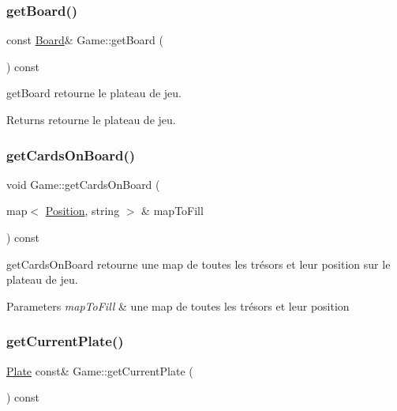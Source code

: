 \subsubsection{\texorpdfstring{getBoard()}{getBoard()}}
{\footnotesize\ttfamily const \mbox{\hyperlink{class_board}{Board}}\& Game\+::get\+Board (\begin{DoxyParamCaption}{ }\end{DoxyParamCaption}) const\hspace{0.3cm}{\ttfamily [inline]}}



get\+Board retourne le plateau de jeu. 

\begin{DoxyReturn}{Returns}
retourne le plateau de jeu. 
\end{DoxyReturn}
\mbox{\label{class_game_a1a21ba908bedd3ca0ae4ea0f63c621d4}} 
\subsubsection{\texorpdfstring{getCardsOnBoard()}{getCardsOnBoard()}}
{\footnotesize\ttfamily void Game\+::get\+Cards\+On\+Board (\begin{DoxyParamCaption}\item[{map$<$ \mbox{\hyperlink{class_position}{Position}}, string $>$ \&}]{map\+To\+Fill }\end{DoxyParamCaption}) const\hspace{0.3cm}{\ttfamily [inline]}}



get\+Cards\+On\+Board retourne une map de toutes les trésors et leur position sur le plateau de jeu. 


\begin{DoxyParams}{Parameters}
{\em map\+To\+Fill} & une map de toutes les trésors et leur position \\
\hline
\end{DoxyParams}
\mbox{\label{class_game_a09dad4385b60fb6af3c93de9d7dad0dd}} 
\subsubsection{\texorpdfstring{getCurrentPlate()}{getCurrentPlate()}}
{\footnotesize\ttfamily \mbox{\hyperlink{class_plate}{Plate}} const\& Game\+::get\+Current\+Plate (\begin{DoxyParamCaption}{ }\end{DoxyParamCaption}) const\hspace{0.3cm}{\ttfamily [inline]}}



